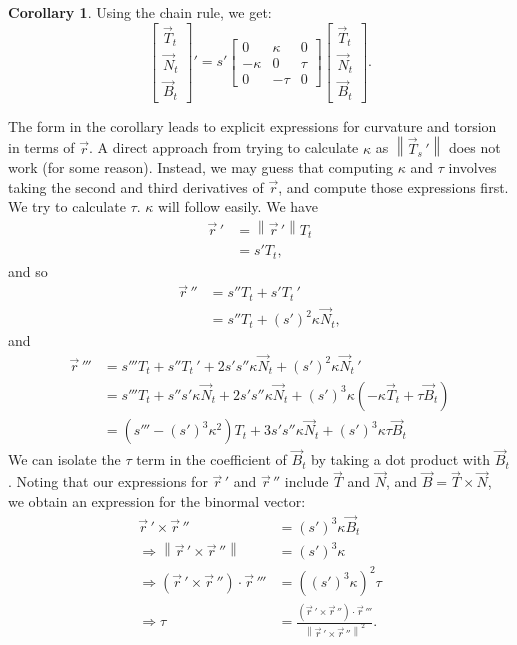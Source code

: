 \documentclass{article}
\theoremstyle{definition}
\newtheorem{cor}{Corollary}[subsubsection]
\begin{document}
\begin{cor}
	Using the chain rule, we get:
	\[\begin{bmatrix}\vec T_t\\\vec N_t\\\vec B_t\end{bmatrix}'=s'\begin{bmatrix}0&\kappa&0\\-\kappa&0&\tau\\0&-\tau&0\end{bmatrix}\begin{bmatrix}\vec T_t\\\vec N_t\\\vec B_t\end{bmatrix}.\]
\end{cor}
The form in the corollary leads to explicit expressions for curvature and torsion in terms of $\vec r$. A direct approach from trying to calculate $\kappa$ as $\left\lVert\vec T_s\,'\right\rVert$ does not work (for some reason). Instead, we may guess that computing $\kappa$ and $\tau$ involves taking the second and third derivatives of $\vec r$, and compute those expressions first.
We try to calculate $\tau$. $\kappa$ will follow easily. We have
\begin{align*}
	\vec r\,'&=\left\lVert\vec r\,'\right\rVert T_t\\
	&=s'T_t,
\end{align*}
and so
\begin{align*}
	\vec r\,''&=s''T_t+s'T_t\,'\\
	&=s''T_t+(s')^2\kappa \vec N_t,
\end{align*}
and
\begin{align*}
	\vec r\,'''&=s'''T_t+s''T_t\,'+2s's''\kappa \vec N_t+(s')^2\kappa \vec N_t\,'\\
	&=s'''T_t+s''s'\kappa \vec N_t+2s's''\kappa \vec N_t+(s')^3\kappa(-\kappa \vec T_t+\tau\vec B_t)\\
	&=(s'''-(s')^3\kappa^2)T_t+3s's''\kappa\vec N_t+(s')^3\kappa\tau\vec B_t
\end{align*}
We can isolate the $\tau$ term in the coefficient of $\vec B_t$ by taking a dot product with $\vec B_t$. Noting that our expressions for $\vec r\,'$ and $\vec r\,''$ include $\vec T$ and $\vec N$, and $\vec B=\vec T\times\vec N$, we obtain an expression for the binormal vector:
\begin{align*}
	\vec r\,'\times\vec r\,''&=(s')^3\kappa\vec B_t\\
	\Rightarrow\left\lVert\vec r\,'\times\vec r\,''\right\rVert&=(s')^3\kappa\\
	\Rightarrow(\vec r\,'\times\vec r\,'')\cdot\vec r\,'''&=((s')^3\kappa)^2\tau\\
	\Rightarrow\tau&=\frac{(\vec r\,'\times\vec r\,'')\cdot\vec r\,'''}{\left\lVert\vec r\,'\times\vec r\,''\right\rVert^2}.
\end{align*}
\end{document}
